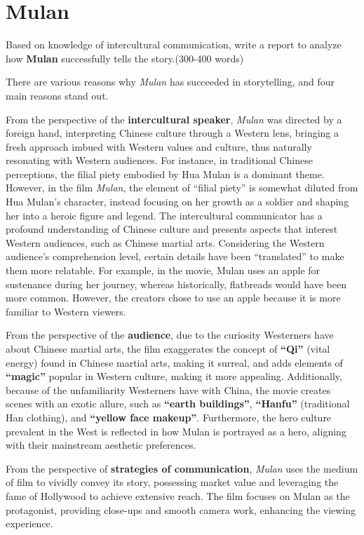 \section{Mulan}

\begin{question}{}{}
    Based on knowledge of intercultural communication, write a report to analyze how \textbf{Mulan} successfully tells the story.(300-400 words)
\end{question}

There are various reasons why \textit{Mulan} has succeeded in storytelling, and four main reasons stand out.

From the perspective of the \textbf{intercultural speaker}, \textit{Mulan} was directed by a foreign hand, interpreting Chinese culture through a Western lens, bringing a fresh approach imbued with Western values and culture, thus naturally resonating with Western audiences. For instance, in traditional Chinese perceptions, the filial piety embodied by Hua Mulan is a dominant theme. However, in the film \textit{Mulan}, the element of ``filial piety'' is somewhat diluted from Hua Mulan's character, instead focusing on her growth as a soldier and shaping her into a heroic figure and legend. The intercultural communicator has a profound understanding of Chinese culture and presents aspects that interest Western audiences, such as Chinese martial arts. Considering the Western audience's comprehension level, certain details have been ``translated'' to make them more relatable. For example, in the movie, Mulan uses an apple for sustenance during her journey, whereas historically, flatbreads would have been more common. However, the creators chose to use an apple because it is more familiar to Western viewers.

From the perspective of the \textbf{audience}, due to the curiosity Westerners have about Chinese martial arts, the film exaggerates the concept of \textbf{``Qi''} (vital energy) found in Chinese martial arts, making it surreal, and adds elements of \textbf{``magic''} popular in Western culture, making it more appealing. Additionally, because of the unfamiliarity Westerners have with China, the movie creates scenes with an exotic allure, such as \textbf{``earth buildings''}, \textbf{``Hanfu''} (traditional Han clothing), and \textbf{``yellow face makeup''}. Furthermore, the hero culture prevalent in the West is reflected in how Mulan is portrayed as a hero, aligning with their mainstream aesthetic preferences.

From the perspective of \textbf{strategies of communication}, \textit{Mulan} uses the medium of film to vividly convey its story, possessing market value and leveraging the fame of Hollywood to achieve extensive reach. The film focuses on Mulan as the protagonist, providing close-ups and smooth camera work, enhancing the viewing experience.

